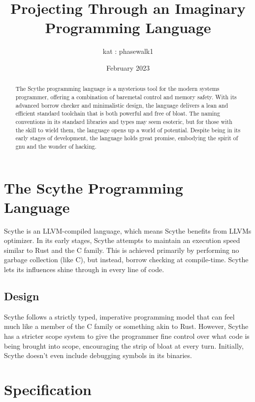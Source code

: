 \documentclass{article}
\author{kat : phasewalk1}
\title{Projecting Through an Imaginary Programming Language}
\date{February 2023}
\begin{document}
\maketitle
\begin{titlingpage}
\begin{abstract}
The Scythe programming language is a mysterious tool for the modern systems programmer, offering a combination of baremetal control and memory safety. With its advanced borrow checker and minimalistic design, the language delivers a lean and efficient standard toolchain that is both powerful and free of bloat. The naming conventions in its standard libraries and types may seem esoteric, but for those with the skill to wield them, the language opens up a world of potential. Despite being in its early stages of development, the language holds great promise, embodying the spirit of gnu and the wonder of hacking.
\end{abstract}
\end{titlingpage}

\section{The Scythe Programming Language}
Scythe is an LLVM-compiled language, which means Scythe benefits from LLVMs optimizer. In its early stages, Scythe attempts to maintain an execution speed similar to Rust and the C family. This is achieved primarily by performing no garbage collection (like C), but instead, borrow checking at compile-time. Scythe lets its influences shine through in every line of code. 
\subsection{Design}

Scythe follows a strictly typed, imperative programming model that can feel much like a member of the C family or something akin to Rust. However, Scythe has a stricter scope system to give the programmer fine control over what code is being brought into scope, encouraging the strip of bloat at every turn. Initially, Scythe doesn't even include debugging symbols in its binaries.

\section{Specification}
\end{document}
